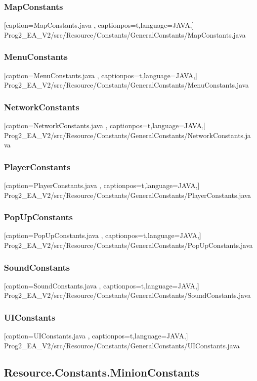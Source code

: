 \documentclass[a4paper,12pt]{scrartcl}
\begin{document}
	\subsubsection{MapConstants}
	
	[caption={MapConstants.java}
	\label{lst:javaclass},
	captionpos=t,language=JAVA,]
	{Prog2_EA_V2/src/Resource/Constants/GeneralConstants/MapConstants.java}
	\subsubsection{MenuConstants}
	
	[caption={MenuConstants.java}
	\label{lst:javaclass},
	captionpos=t,language=JAVA,]
	{Prog2_EA_V2/src/Resource/Constants/GeneralConstants/MenuConstants.java}
	\subsubsection{NetworkConstants}
	
	[caption={NetworkConstants.java}
	\label{lst:javaclass},
	captionpos=t,language=JAVA,]
	{Prog2_EA_V2/src/Resource/Constants/GeneralConstants/NetworkConstants.java}
	\subsubsection{PlayerConstants}
	
	[caption={PlayerConstants.java}
	\label{lst:javaclass},
	captionpos=t,language=JAVA,]
	{Prog2_EA_V2/src/Resource/Constants/GeneralConstants/PlayerConstants.java}
    \subsubsection{PopUpConstants}
	
	[caption={PopUpConstants.java}
	\label{lst:javaclass},
	captionpos=t,language=JAVA,]
	{Prog2_EA_V2/src/Resource/Constants/GeneralConstants/PopUpConstants.java}
	\subsubsection{SoundConstants}
	
	[caption={SoundConstants.java}
	\label{lst:javaclass},
	captionpos=t,language=JAVA,]
	{Prog2_EA_V2/src/Resource/Constants/GeneralConstants/SoundConstants.java}
	\subsubsection{UIConstants}
	
	[caption={UIConstants.java}
	\label{lst:javaclass},
	captionpos=t,language=JAVA,]
	{Prog2_EA_V2/src/Resource/Constants/GeneralConstants/UIConstants.java}
	\subsection{Resource.Constants.MinionConstants}
\end{document}

